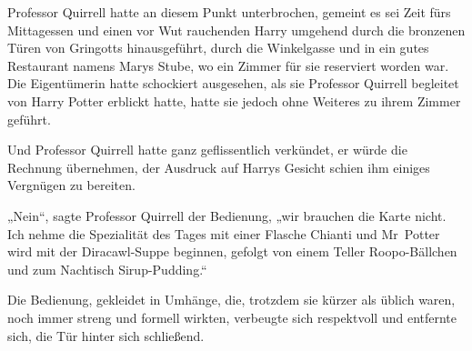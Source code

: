 Professor Quirrell hatte an diesem Punkt unterbrochen, gemeint es sei Zeit fürs Mittagessen und einen vor Wut rauchenden Harry umgehend durch die bronzenen Türen von Gringotts hinausgeführt, durch die Winkelgasse und in ein gutes Restaurant namens Marys Stube, wo ein Zimmer für sie reserviert worden war. Die Eigentümerin hatte schockiert ausgesehen, als sie Professor Quirrell begleitet von Harry Potter erblickt hatte, hatte sie jedoch ohne Weiteres zu ihrem Zimmer geführt.

Und Professor Quirrell hatte ganz geflissentlich verkündet, er würde die Rechnung übernehmen, der Ausdruck auf Harrys Gesicht schien ihm einiges Vergnügen zu bereiten.

„Nein“, sagte Professor Quirrell der Bedienung, „wir brauchen die Karte nicht. Ich nehme die Spezialität des Tages mit einer Flasche Chianti und Mr~Potter wird mit der Diracawl-Suppe beginnen, gefolgt von einem Teller Roopo-Bällchen und zum Nachtisch Sirup-Pudding.“%

Die Bedienung, gekleidet in Umhänge, die, trotzdem sie kürzer als üblich waren, noch immer streng und formell wirkten, verbeugte sich respektvoll und entfernte sich, die Tür hinter sich schließend.

